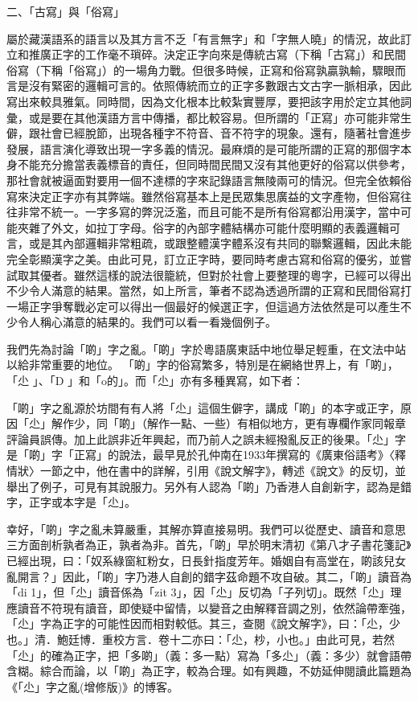 二、「古寫」與「俗寫」

屬於藏漢語系的語言以及其方言不乏「有言無字」和「字無人曉」的情況，故此訂立和推廣正字的工作毫不瑣碎。決定正字向來是傳統古寫（下稱「古寫」）和民間俗寫（下稱「俗寫」）的一場角力戰。但很多時候，正寫和俗寫孰贏孰輸，驟眼而言是沒有緊密的邏輯可言的。依照傳統而立的正字多數跟古文古字一脈相承，因此寫出來較具雅氣。同時間，因為文化根本比較紮實豐厚，要把該字用於定立其他詞彙，或是要在其他漢語方言中傳播，都比較容易。但所謂的「正寫」亦可能非常生僻，跟社會已經脫節，出現各種字不符音、音不符字的現象。還有，隨著社會進步發展，語言演化導致出現一字多義的情況。最麻煩的是可能所謂的正寫的那個字本身不能充分擔當表義標音的責任，但同時間民間又沒有其他更好的俗寫以供參考，那社會就被逼面對要用一個不達標的字來記錄語言無陵兩可的情況。但完全依賴俗寫來決定正字亦有其弊端。雖然俗寫基本上是民眾集思廣益的文字產物，但俗寫往往非常不統一。一字多寫的弊況泛濫，而且可能不是所有俗寫都沿用漢字，當中可能夾雜了外文，如拉丁字母。俗字的內部字體結構亦可能什麼明顯的表義邏輯可言，或是其內部邏輯非常粗疏，或跟整體漢字體系沒有共同的聯繫邏輯，因此未能完全彰顯漢字之美。由此可見，訂立正字時，要同時考慮古寫和俗寫的優劣，並嘗試取其優者。雖然這樣的說法很籠統，但對於社會上要整理的粵字，已經可以得出不少令人滿意的結果。當然，如上所言，筆者不認為透過所謂的正寫和民間俗寫打一場正字爭奪戰必定可以得出一個最好的候選正字，但這過方法依然是可以產生不少令人稱心滿意的結果的。我們可以看一看幾個例子。

我們先為討論「啲」字之亂。「啲」字於粵語廣東話中地位舉足輕重，在文法中站以給非常重要的地位。 「啲」字的俗寫繁多，特別是在網絡世界上，有「啲」，「尐 」、「D 」和「o的」。而「尐」亦有多種異寫，如下者：


「啲」字之亂源於坊間有有人將「尐」這個生僻字，講成「啲」的本字或正字，原因「尐」解作少，同「啲」（解作一點、一些）有相似地方，更有專欄作家同報章評論員誤傳。加上此誤非近年興起，而乃前人之誤未經撥亂反正的後果。「尐」字是「啲」字「正寫」的說法，最早見於孔仲南在1933年撰寫的《廣東俗語考》〈釋情狀〉一節之中，他在書中的詳解，引用《說文解字》，轉述《說文》的反切，並舉出了例子，可見有其說服力。另外有人認為「啲」乃香港人自創新字，認為是錯字，正字或本字是「尐」。

幸好，「啲」字之亂未算嚴重，其解亦算直接易明。我們可以從歷史、讀音和意思三方面剖析孰者為正，孰者為非。首先，「啲」早於明末清初《第八才子書花箋記》已經出現，曰：「奴系綠窗紅粉女，日長針指度芳年。婚姻自有高堂在，啲該兒女亂開言？」因此，「啲」字乃港人自創的錯字茲命題不攻自破。其二，「啲」讀音為「di 1」，但「尐」讀音係為「zit 3」，因「尐」反切為「子列切」。既然「尐」理應讀音不符現有讀音，即使疑中留情，以變音之由解釋音調之別，依然論帶牽強，「尐」字為正字的可能性因而相對較低。其三，查閱《說文解字》，曰：「尐，少也。」清．鮑廷博．重校方言．卷十二亦曰：「尐，杪，小也。」由此可見，若然「尐」的確為正字，把「多啲」（義：多一點）寫為「多尐」（義：多少）就會語帶含糊。綜合而論，以「啲」為正字，較為合理。如有興趣，不妨延伸閱讀此篇題為《「尐」字之亂(增修版)》的博客。

